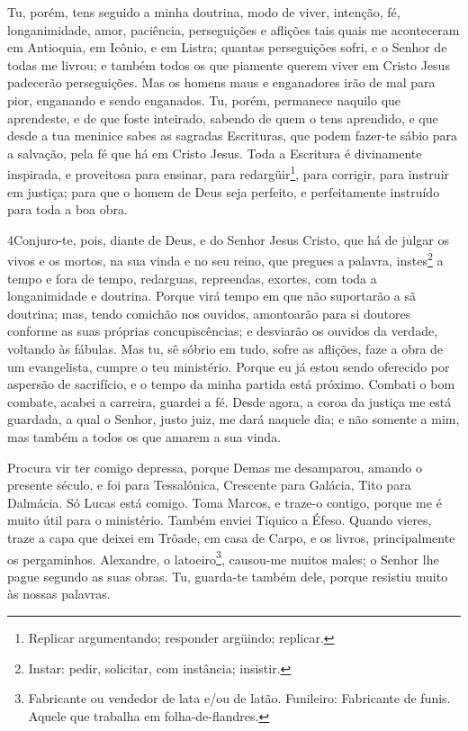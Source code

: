 Tu, porém, tens seguido a minha doutrina, modo de viver,
intenção, fé, longanimidade, amor, paciência, perseguições e
aflições tais quais me aconteceram em Antioquia, em Icônio, e em
Listra; quantas perseguições sofri, e o Senhor de todas me livrou;
e também todos os que piamente querem viver em Cristo Jesus
padecerão perseguições. Mas os homens maus e enganadores irão
de mal para pior, enganando e sendo enganados. Tu, porém,
permanece naquilo que aprendeste, e de que foste inteirado, sabendo
de quem o tens aprendido, e que desde a tua meninice sabes as
sagradas Escrituras, que podem fazer-te sábio para a salvação, pela
fé que há em Cristo Jesus. Toda a Escritura é divinamente
inspirada, e proveitosa para ensinar, para
redargüir\footnote{Replicar argumentando; responder argüindo;
replicar.}, para corrigir, para instruir em justiça; para que
o homem de Deus seja perfeito, e perfeitamente instruído para toda a
boa obra.

\medskip

\lettrine{4} Conjuro-te, pois, diante de Deus, e do Senhor
Jesus Cristo, que há de julgar os vivos e os mortos, na sua vinda e
no seu reino, que pregues a palavra, instes\footnote{Instar:
pedir, solicitar, com instância; insistir.} a tempo e fora de tempo,
redarguas, repreendas, exortes, com toda a longanimidade e doutrina.
Porque virá tempo em que não suportarão a sã doutrina; mas,
tendo comichão nos ouvidos, amontoarão para si doutores conforme as
suas próprias concupiscências; e desviarão os ouvidos da
verdade, voltando às fábulas. Mas tu, sê sóbrio em tudo, sofre
as aflições, faze a obra de um evangelista, cumpre o teu ministério.
Porque eu já estou sendo oferecido por aspersão de sacrifício, e
o tempo da minha partida está próximo. Combati o bom combate,
acabei a carreira, guardei a fé. Desde agora, a coroa da justiça
me está guardada, a qual o Senhor, justo juiz, me dará naquele dia;
e não somente a mim, mas também a todos os que amarem a sua vinda.

Procura vir ter comigo depressa, porque Demas me
desamparou, amando o presente século, e foi para Tessalônica,
Crescente para Galácia, Tito para Dalmácia. Só Lucas está
comigo. Toma Marcos, e traze-o contigo, porque me é muito útil para
o ministério. Também enviei Tíquico a Éfeso. Quando
vieres, traze a capa que deixei em Trôade, em casa de Carpo, e os
livros, principalmente os pergaminhos. Alexandre, o
latoeiro\footnote{Fabricante ou vendedor de lata e/ou de latão.
Funileiro: Fabricante de funis. Aquele que trabalha em
folha-de-flandres.}, causou-me muitos males; o Senhor lhe pague
segundo as suas obras. Tu, guarda-te também dele, porque
resistiu muito às nossas palavras.

